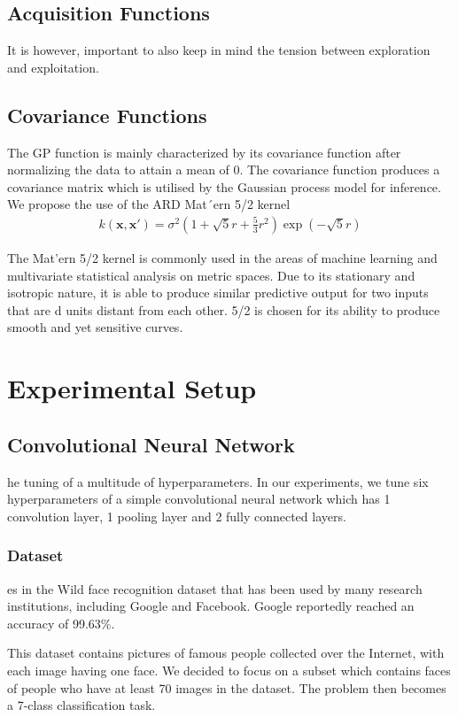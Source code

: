 \documentclass[letterpaper]{article}
\begin{document}
\subsection{Acquisition Functions}
It is however, important to also keep in mind the tension between exploration and
exploitation.

\subsection{Covariance Functions}
The GP function is mainly characterized by its covariance function after normalizing the data to attain a mean of 0. The covariance function produces a covariance matrix which is utilised by the Gaussian process model for inference.
We propose the use of the ARD Mat´ern 5/2 kernel
\begin{align*}
	k (\textbf{x},\textbf{x}') = \sigma^2(1+\sqrt5r+\frac{5}{3}r^2)\exp(-\sqrt5r)
\end{align*}

The Mat'ern 5/2 kernel is commonly used in the areas of machine learning and multivariate statistical analysis on metric spaces. Due to its stationary and isotropic nature, it is able to produce similar predictive output for two inputs that are d units distant from each other. 5/2 is chosen for its ability to produce smooth and yet sensitive curves.

\section{Experimental Setup}

\subsection{Convolutional Neural Network}
he tuning of a multitude of hyperparameters. In our experiments, we tune six hyperparameters of a simple convolutional neural network which has 1 convolution layer, 1 pooling layer and 2 fully connected layers.

\subsubsection{Dataset}
es in the Wild face recognition dataset that has been used by many research institutions, including Google and Facebook. Google reportedly reached an accuracy of 99.63\%.

This dataset contains pictures of famous people collected over the Internet, with each image having one face. We decided to focus on a subset which contains faces of people who have at least 70 images in the dataset. The problem then becomes a 7-class classification task.
\end{document}
